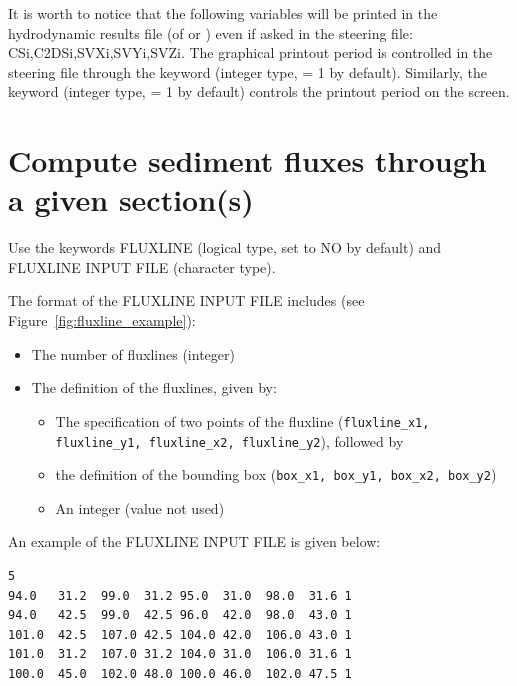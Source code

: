 It is worth to notice that the following variables will be printed in the hydrodynamic results file (of  or ) even if asked in the \gaia{} steering file:
CSi,C2DSi,SVXi,SVYi,SVZi.
The graphical printout period is controlled in the  steering file through the keyword  (integer type, {\ttfamily = 1} by default).
Similarly, the keyword  (integer type, {\ttfamily = 1} by default) controls the printout period on the screen.

\section{Compute sediment fluxes through a given section(s)}
Use the keywords {\ttfamily FLUXLINE} (logical type, set to {\ttfamily NO} by default) and {\ttfamily FLUXLINE INPUT FILE} (character type).

The format of the {\ttfamily FLUXLINE INPUT FILE} includes (see Figure~\ref{fig:fluxline_example}):
\begin{itemize}
\item The number of fluxlines (integer)
\item The definition of the fluxlines, given by:
  \begin{itemize}
  \item The specification of two points of the fluxline (\texttt{fluxline\_x1, fluxline\_y1, fluxline\_x2, fluxline\_y2}), followed by
  \item the definition of the bounding box (\texttt{box\_x1, box\_y1, box\_x2, box\_y2})
  \item An integer (value not used)
  \end{itemize}
\end{itemize}

An example of the {\ttfamily FLUXLINE INPUT FILE} is given below:

\begin{lstlisting}[frame=trBL]
5
94.0   31.2  99.0  31.2 95.0  31.0  98.0  31.6 1
94.0   42.5  99.0  42.5 96.0  42.0  98.0  43.0 1
101.0  42.5  107.0 42.5 104.0 42.0  106.0 43.0 1
101.0  31.2  107.0 31.2 104.0 31.0  106.0 31.6 1
100.0  45.0  102.0 48.0 100.0 46.0  102.0 47.5 1
\end{lstlisting}

